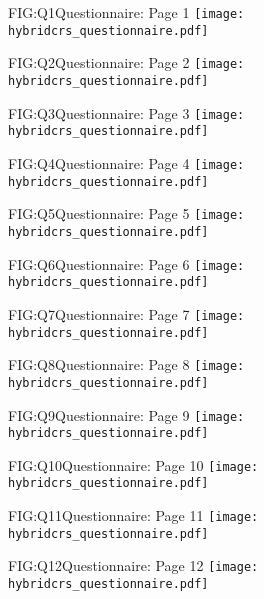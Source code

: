 \begin{figure}[Questionnaire: Page 1]{FIG:Q1}{Questionnaire: Page 1}
    \texttt{[image: hybridcrs\_questionnaire.pdf]}
\end{figure}
\begin{figure}[Questionnaire: Page 2]{FIG:Q2}{Questionnaire: Page 2}
    \texttt{[image: hybridcrs\_questionnaire.pdf]}
\end{figure}
\begin{figure}[Questionnaire: Page 3]{FIG:Q3}{Questionnaire: Page 3}
    \texttt{[image: hybridcrs\_questionnaire.pdf]}
\end{figure}
\begin{figure}[Questionnaire: Page 4]{FIG:Q4}{Questionnaire: Page 4}
    \texttt{[image: hybridcrs\_questionnaire.pdf]}
\end{figure}
\begin{figure}[Questionnaire: Page 5]{FIG:Q5}{Questionnaire: Page 5}
    \texttt{[image: hybridcrs\_questionnaire.pdf]}
\end{figure}
\begin{figure}[Questionnaire: Page 6]{FIG:Q6}{Questionnaire: Page 6}
    \texttt{[image: hybridcrs\_questionnaire.pdf]}
\end{figure}
\begin{figure}[Questionnaire: Page 7]{FIG:Q7}{Questionnaire: Page 7}
    \texttt{[image: hybridcrs\_questionnaire.pdf]}
\end{figure}
\begin{figure}[Questionnaire: Page 8]{FIG:Q8}{Questionnaire: Page 8}
    \texttt{[image: hybridcrs\_questionnaire.pdf]}
\end{figure}
\begin{figure}[Questionnaire: Page 9]{FIG:Q9}{Questionnaire: Page 9}
    \texttt{[image: hybridcrs\_questionnaire.pdf]}
\end{figure}
\begin{figure}[Questionnaire: Page 10]{FIG:Q10}{Questionnaire: Page 10}
    \texttt{[image: hybridcrs\_questionnaire.pdf]}
\end{figure}
\begin{figure}[Questionnaire: Page 11]{FIG:Q11}{Questionnaire: Page 11}
    \texttt{[image: hybridcrs\_questionnaire.pdf]}
\end{figure}
\begin{figure}[Questionnaire: Page 12]{FIG:Q12}{Questionnaire: Page 12}
    \texttt{[image: hybridcrs\_questionnaire.pdf]}
\end{figure}
